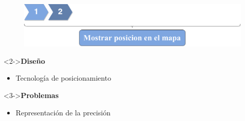 \begin{slide}
  \begin{center}
    \begin{figure}[!h]
      \includegraphics[height=0.27\textheight]{img/ite2.png}
    \end{figure}
    \vspace{0.5cm}
    \begin{minipage}[b]{0.4\linewidth}
      \begin{block}<2->{\textbf{Diseño}}
        \begin{itemize}
          \item Tecnología de posicionamiento
        \end{itemize}
      \end{block}
    \end{minipage}
    \hspace{0.5cm}
    \begin{minipage}[b]{0.4\linewidth}
      \begin{block}<3->{\textbf{Problemas}}
        \begin{itemize}
          \item Representación de la precisión
        \end{itemize}
      \end{block}
    \end{minipage}
  \end{center}
\end{slide}

